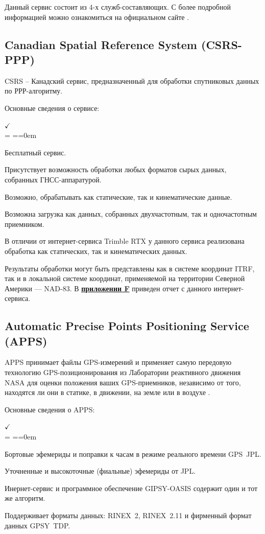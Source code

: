 Данный сервис состоит из 4-х служб-составляющих. С более подробной информацией можно ознакомиться на официальном сайте \cite{src69}. 
 
 
\subsection{Canadian Spatial Reference System (CSRS-PPP)  }\label{subsec:ch2/sec1/sub3}
 
CSRS – Канадский сервис, предназначенный для обработки спутниковых данных по РРР-алгоритму.
 
Основные сведения о сервисе: 
 
\begin{list}{$ \checkmark $\\[6pt]} {\parsep = \parskip \itemsep=\parsep \topsep=0em}
	\item Бесплатный сервис. 
	\item Присутствует возможность обработки любых форматов сырых данных, собранных ГНСС-аппаратурой.
	\item Возможно, обрабатывать как статические, так и кинематические данные.
	\item Возможна загрузка как данных, собранных двухчастотным, так и одночастотным приемником.
\end{list}

В отличии от интернет-сервиса Trimble RTX у данного сервиса реализована обработка как статических, так и кинематических данных. 

Результаты обработки могут быть представлены как в системе координат ITRF, так и в локальной системе координат, применяемой на территории Северной Америки --- NAD-83. В \textbf{\underline{приложении F}} приведен отчет с данного интернет-сервиса.


\subsection{Automatic Precise Points Positioning Service (APPS)}\label{subsec:ch2/sec1/sub4}

APPS принимает файлы GPS-измерений и применяет самую передовую технологию GPS-позиционирования из Лаборатории реактивного движения NASA для оценки положения ваших GPS-приемников, независимо от того, находятся ли они в статике, в движении, на земле или в воздухе \cite{src80}.

Основные сведения о APPS:

\begin{list}{$ \checkmark $\\[6pt]} {\parsep = \parskip \itemsep=\parsep \topsep=0em}
	\item Бортовые эфемериды и поправки к часам в режиме реального времени GPS~JPL. 
	\item Уточненные и высокоточные (фиальные) эфемериды от JPL.
	\item Инернет-сервис и программное обеспечение  GIPSY-OASIS содержит один и тот же алгоритм.
	\item Поддерживает форматы данных: RINEX~2, RINEX~2.11 и фирменный формат данных GPSY~TDP.
\end{list}

